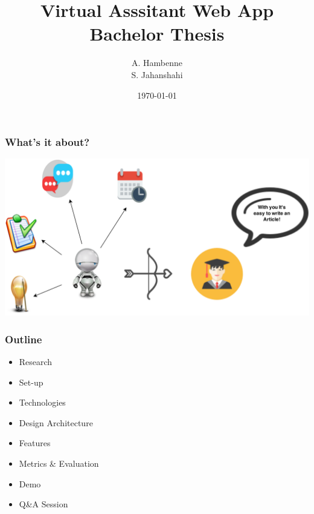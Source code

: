 \documentclass{beamer}
\title[BEP]{Virtual Asssitant Web App\\ \small{Bachelor Thesis}}
\institute[TU Delft]{Delft University of Technology}
\author{A. Hambenne\\
S. Jahanshahi}
\date{\today}
\begin{document}
{
%
\frame{\titlepage}
}

{
}




\begin{frame}
\frametitle{What's it about?}
\centering
\includegraphics[scale=0.16]{./images/va.png}
\end{frame}

\begin{frame}\frametitle{Outline}
	\begin{itemize}
		\item Research 
		\item Set-up
		\item Technologies
		\item Design Architecture
		\item Features
		\item Metrics  \& Evaluation
		\item Demo
		\item Q\&A Session
	\end{itemize}
\end{frame}
\end{document}
